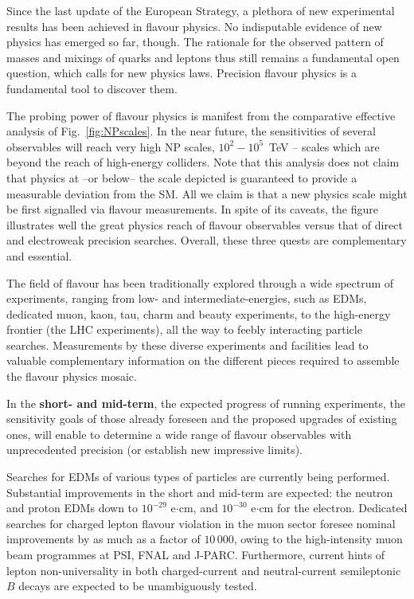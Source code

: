 
 Since the last update of the European Strategy, a plethora of new experimental results  has been achieved in flavour physics.  No indisputable evidence of new physics has  emerged so far,  though. 
 The rationale for the observed pattern of masses and mixings of quarks and leptons thus still remains a fundamental open question, which calls for new physics laws.  Precision flavour physics is a fundamental tool to discover them.


  The probing power of flavour physics is manifest from the comparative effective analysis of Fig.~\ref{fig:NPscales}. In the near future, the sensitivities of several observables will reach very high NP scales, $10^2-10^5$~TeV -- scales which are beyond the reach of high-energy colliders.  Note that this analysis does not claim that physics at --or below-- the  scale depicted is guaranteed to provide a measurable deviation from the SM.  All we claim is that a new physics scale  might be first signalled via 
flavour measurements. In spite of its 
 caveats, the figure illustrates well the great physics reach of flavour observables versus that of  direct and electroweak precision searches. Overall, these three quests are complementary and essential.  

 

The field of flavour has been traditionally explored through a wide spectrum of experiments, ranging from low- and intermediate-energies, such as  EDMs, dedicated muon, kaon, tau, charm and beauty experiments, to the high-energy frontier (the LHC experiments), all the way to feebly interacting particle searches. Measurements by these diverse experiments and facilities lead to valuable complementary information on the different pieces required to assemble the flavour physics mosaic. 

In the \textbf{short- and mid-term}, the expected progress of running experiments, the sensitivity goals of those already foreseen and the proposed upgrades of existing ones, will enable to determine a wide range of flavour observables with unprecedented precision (or establish new impressive limits).

Searches for EDMs of various types of particles are currently being performed. 
Substantial improvements in the short and mid-term are expected: the neutron and proton EDMs down to $10^{-29} $ e$\cdot$cm, and  $10^{-30} $ e$\cdot$cm  for the electron. Dedicated searches for charged lepton flavour violation in the muon sector foresee nominal improvements by as much as a factor of $10\,000$,  owing to the  high-intensity muon beam programmes at PSI, FNAL and J-PARC.   Furthermore, current hints of lepton non-universality in both charged-current and neutral-current semileptonic $B$ decays are expected to be  unambiguously tested.


